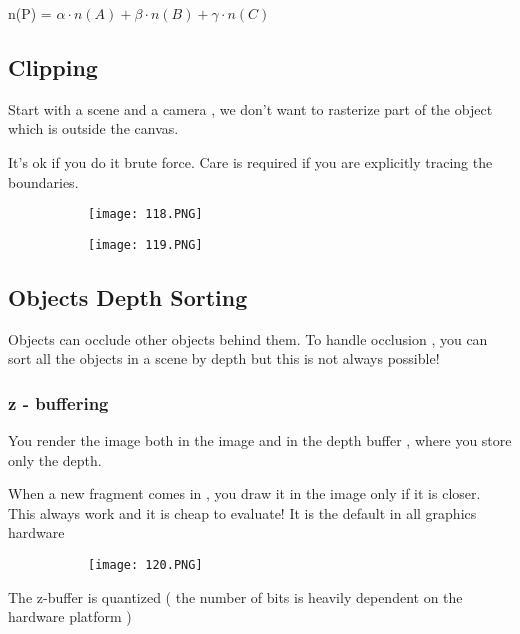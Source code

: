 \documentclass{article}
\begin{document}
n(P) = $\alpha \cdot n(A) + \beta \cdot n(B) + \gamma \cdot n(C)$

\subsection{Clipping}

Start with a scene and a camera , we don't want to rasterize part of the object which is outside the canvas.

It's ok if you do it brute force. Care is required if you are explicitly tracing the boundaries.

\begin{figure}[ht!]
  \centering
  \begin{subfigure}[b]{0.49\linewidth}
    \texttt{[image: 118.PNG]}
  \end{subfigure}
  \begin{subfigure}[b]{0.3\textwidth}
         \centering
         \texttt{[image: 119.PNG]}
     \end{subfigure}
\end{figure}

\subsection{Objects Depth Sorting}

Objects can occlude other objects behind them. To handle occlusion , you can sort all the objects in a scene by depth but this is not always possible!

\subsubsection{z - buffering}

You render the image both in the image and in the depth buffer , where you store only the depth. 

When a new fragment comes in , you draw it in the image only if it is closer.
This always work and it is cheap to evaluate! It is the default in all graphics hardware

\begin{figure}[ht!]
  \centering
  \begin{subfigure}[b]{0.4\linewidth}
    \texttt{[image: 120.PNG]}
  \end{subfigure}
\end{figure}

The z-buffer is quantized ( the number of bits is heavily dependent on the hardware platform )
\end{document}

